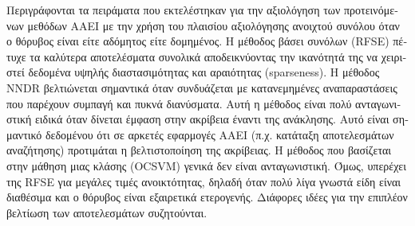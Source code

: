 \documentclass[
    12pt, %
    english, %
    singlespacing, %
    liststotoc, %
    headsepline, %
]{DoctoralThesis} %
\begin{document}
\begin{abstractGR}
\begin{greek}
Περιγράφονται τα πειράματα που εκτελέστηκαν για την αξιολόγηση των προτεινόμενων μεθόδων ΑΑΕΙ με την χρήση του πλαισίου αξιολόγησης ανοιχτού συνόλου όταν ο θόρυβος είναι είτε αδόμητος είτε δομημένος. Η μέθοδος βάσει συνόλων (RFSE) πέτυχε τα καλύτερα αποτελέσματα συνολικά αποδεικνύοντας την ικανότητά της να χειριστεί δεδομένα υψηλής διαστασιμότητας και αραιότητας (sparseness). Η μέθοδος NNDR βελτιώνεται σημαντικά όταν συνδυάζεται με κατανεμημένες αναπαραστάσεις που παρέχουν συμπαγή και πυκνά διανύσματα. Αυτή η μέθοδος είναι πολύ ανταγωνιστική ειδικά όταν δίνεται έμφαση στην ακρίβεια έναντι της ανάκλησης. Αυτό είναι σημαντικό δεδομένου ότι σε αρκετές εφαρμογές ΑΑΕΙ (π.χ. κατάταξη αποτελεσμάτων αναζήτησης) προτιμάται η βελτιστοποίηση της ακρίβειας. Η μέθοδος που βασίζεται στην μάθηση μιας κλάσης (OCSVM) γενικά δεν είναι ανταγωνιστική. Όμως, υπερέχει της RFSE για μεγάλες τιμές ανοικτότητας, δηλαδή όταν πολύ λίγα γνωστά είδη είναι διαθέσιμα και ο θόρυβος είναι εξαιρετικά ετερογενής. Διάφορες ιδέες για την επιπλέον βελτίωση των αποτελεσμάτων συζητούνται.
\end{greek}

\end{abstractGR}


\tableofcontents %
\listoffigures %
\listoftables %


\mainmatter %
\pagestyle{thesis} %













\printbibliography[heading=bibintoc]
\end{document}

